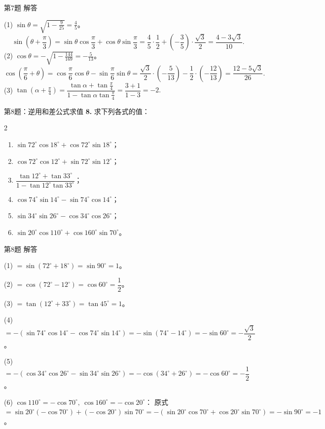 \documentclass[10pt,aspectratio=169,serif]{beamer}
\begin{document}
\begin{frame}[t]{第7题 解答}
\begin{tcolorbox}[colback=orange!10,colframe=orange,title=\textbf{解}]
(1) $\sin\theta=\sqrt{1-\frac{9}{25}}=\frac45$。
\[
\sin\!\left(\theta+\frac{\pi}{3}\right)=\sin\theta\cos\frac{\pi}{3}+\cos\theta\sin\frac{\pi}{3}
=\frac45\cdot\frac12+\!\left(-\frac35\right)\!\cdot\frac{\sqrt3}{2}=\frac{4-3\sqrt3}{10}.
\]
(2) $\cos\theta=-\sqrt{1-\frac{144}{169}}=-\frac5{13}$。
\[
\cos\!\left(\frac{\pi}{6}+\theta\right)=\cos\frac{\pi}{6}\cos\theta-\sin\frac{\pi}{6}\sin\theta
=\frac{\sqrt3}{2}\!\cdot\!\left(-\frac5{13}\right)-\frac12\!\cdot\!\left(-\frac{12}{13}\right)
=\frac{12-5\sqrt3}{26}.
\]
(3) $\tan(\alpha+\frac{\pi}{4})=\dfrac{\tan\alpha+\tan\frac{\pi}{4}}{1-\tan\alpha\tan\frac{\pi}{4}}=\dfrac{3+1}{1-3}=-2.$
\end{tcolorbox}
\end{frame}

\begin{frame}[t]{第8题：逆用和差公式求值}
\textbf{8.} 求下列各式的值：
\begin{multicols}{2}
\begin{enumerate}
  \item $\sin72^\circ\cos18^\circ+\cos72^\circ\sin18^\circ$；
  \item $\cos72^\circ\cos12^\circ+\sin72^\circ\sin12^\circ$；
  \item $\dfrac{\tan12^\circ+\tan33^\circ}{1-\tan12^\circ\tan33^\circ}$；
  \item $\cos74^\circ\sin14^\circ-\sin74^\circ\cos14^\circ$；
  \item $\sin34^\circ\sin26^\circ-\cos34^\circ\cos26^\circ$；
  \item $\sin20^\circ\cos110^\circ+\cos160^\circ\sin70^\circ$。
\end{enumerate}
\end{multicols}
\end{frame}

\begin{frame}[t]{第8题 解答}
\begin{tcolorbox}[colback=orange!10,colframe=orange,title=\textbf{解}]
(1) $=\sin(72^\circ+18^\circ)=\sin90^\circ=1$。

(2) $=\cos(72^\circ-12^\circ)=\cos60^\circ=\dfrac12$。

(3) $=\tan(12^\circ+33^\circ)=\tan45^\circ=1$。

(4) $=-(\sin74^\circ\cos14^\circ-\cos74^\circ\sin14^\circ)=-\sin(74^\circ-14^\circ)=-\sin60^\circ=-\dfrac{\sqrt3}{2}$。

(5) $=-(\cos34^\circ\cos26^\circ-\sin34^\circ\sin26^\circ)=-\cos(34^\circ+26^\circ)=-\cos60^\circ=-\dfrac12$。

(6) $\cos110^\circ=-\cos70^\circ,\ \cos160^\circ=-\cos20^\circ$：
原式 $=\sin20^\circ(-\cos70^\circ)+(-\cos20^\circ)\sin70^\circ=-(\sin20^\circ\cos70^\circ+\cos20^\circ\sin70^\circ)=-\sin90^\circ=-1$。
\end{tcolorbox}
\end{frame}
\end{document}
